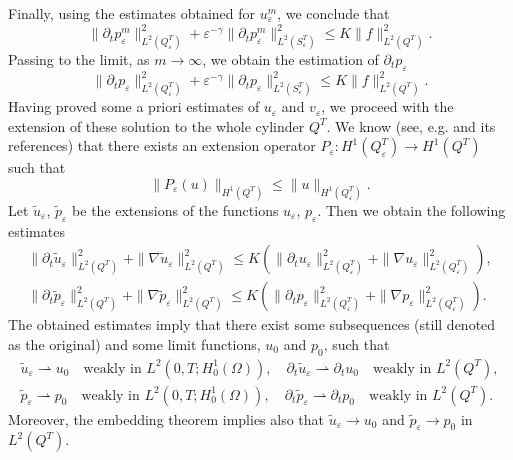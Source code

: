 \documentclass[reqno]{amsart}
\begin{document}
Finally, using the estimates obtained for $u_{\varepsilon }^m$, we conclude that
\begin{equation}
\| \partial _{t}p_{\varepsilon }^m\| _{L^2(Q_{\varepsilon
}^{T})}^2+\varepsilon ^{-\gamma }\| \partial _{t}p_{\varepsilon
}^m\| _{L^2(S_{\varepsilon }^{T})}^2\leq K\| f\|
_{L^2(Q^{T})}^2.
\end{equation}
Passing to the limit, as $m\to \infty $, we obtain the estimation of
$\partial _{t}p_{\varepsilon }$
\begin{equation}
\| \partial _{t}p_{\varepsilon }\| _{L^2(Q_{\varepsilon
}^{T})}^2+\varepsilon ^{-\gamma }\| \partial _{t}p_{\varepsilon }\|
_{L^2(S_{\varepsilon }^{T})}^2\leq K\| f\| _{L^2(Q^{T})}^2.
\end{equation}
Having proved some a priori estimates of $u_{\varepsilon }$ and
$v_{\varepsilon }$, we proceed with the extension of these solution to the
whole cylinder $Q^{T}$. We know (see, e.g. \cite{DiGoShBook} and its
references) that there exists an extension operator $P_{\varepsilon
}:H^{1}(Q_{\varepsilon }^{T})\to H^{1}(Q^{T})$ such that
\[
\| P_{\varepsilon }(u)\| _{H^{1}(Q^{T})}\leq \| u\|
_{H^{1}(Q_{\varepsilon }^{T})}.
\]
Let $\tilde{u}_{\varepsilon }$, $\tilde{p}_{\varepsilon }$ be the extensions
of the functions $u_{\varepsilon }$, $p_{\varepsilon }$. Then we obtain the
following estimates
\begin{gather}
\| \partial _{t}\tilde{u}_{\varepsilon }\| _{L^2(Q^{T})}^2+\|
\nabla \tilde{u}_{\varepsilon }\| _{L^2(Q^{T})}^2\leq K(\|
\partial _{t}u_{\varepsilon }\| _{L^2(Q_{\varepsilon }^{T})}^2+\|
\nabla u_{\varepsilon }\| _{L^2(Q_{\varepsilon }^{T})}^2),
\label{ext u estim} \\
\| \partial _{t}\tilde{p}_{\varepsilon }\| _{L^2(Q^{T})}^2+\|
\nabla \tilde{p}_{\varepsilon }\| _{L^2(Q^{T})}^2\leq K(\|
\partial _{t}p_{\varepsilon }\| _{L^2(Q_{\varepsilon }^{T})}^2+\|
\nabla p_{\varepsilon }\| _{L^2(Q_{\varepsilon }^{T})}^2).
\label{ext p estim}
\end{gather}
The obtained estimates imply that there exist some subsequences (still
denoted as the original) and some limit functions, $u_0$ and $p_0$, such
that
\begin{equation}
\begin{gathered}
\tilde{u}_{\varepsilon }\rightharpoonup u_0\quad
 \text{weakly in }L^2(0,T;H_0^{1}(\Omega )),\quad
\partial _{t}\tilde{u}_{\varepsilon }\rightharpoonup \partial _{t}u_0\quad
\text{weakly in }L^2(Q^{T}), \\
\tilde{p}_{\varepsilon }\rightharpoonup p_0\quad
 \text{weakly in }L^2(0,T;H_0^{1}(\Omega )),\quad
\partial _{t}\tilde{p}_{\varepsilon }\rightharpoonup \partial _{t}p_0\quad
 \text{weakly in }L^2(Q^{T}).
\end{gathered}  \label{limit func def}
\end{equation}
Moreover, the embedding theorem implies also that
$\tilde{u}_{\varepsilon}\to u_0$ and $\tilde{p}_{\varepsilon }\to p_0$ in
$L^2(Q^{T})$.
\end{document}

